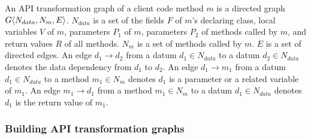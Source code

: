 An API transformation graph of a client code method $m$ is a directed graph
$G\langle N_{data}, N_{m}, E \rangle$. $N_{data}$ is a set of the fields
$F$ of $m$'s declaring class, local variables $V$ of $m$, parameters
$P_1$ of $m$, parameters $P_2$ of methods called by $m$, and return
values $R$ of all methods. $N_{m}$ is a set of methods called by
$m$. $E$ is a set of directed edges. An edge $d_1\rightarrow d_2$
from a datum $d_1 \in N_{data}$ to a datum $d_2 \in N_{data}$
denotes the data dependency from $d_1$ to $d_2$. An edge $d_1
\rightarrow m_1$ from a datum $d_1 \in N_{data}$  to a method $ m_1
\in N_{m}$ denotes $d_1$ is a parameter or a related variable of
$m_1$. An edge $m_1 \rightarrow d_1$ from a method $m_1 \in N_{m}$
to a datum $d_1 \in N_{data}$ denotes $d_1$ is the return value of
$m_1$.

%
%
%

\subsubsection{Building API transformation graphs }


